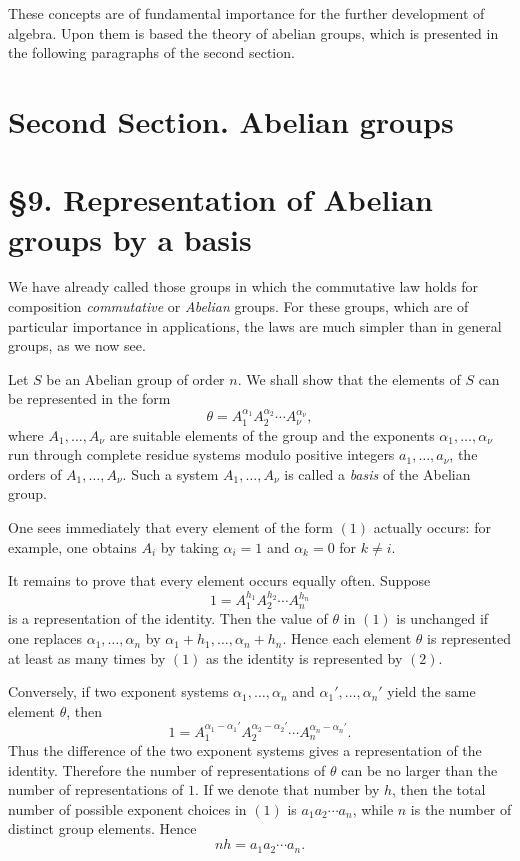 \documentclass[11pt,a4paper]{book}
\begin{document}
These concepts are of fundamental importance for the further development of algebra. Upon them is based the theory of abelian groups, which is presented in the following paragraphs of the second section.

\section*{Second Section. Abelian groups}

\section*{\S 9. Representation of Abelian groups by a basis}

We have already called those groups in which the commutative law holds for composition \emph{commutative} or \emph{Abelian} groups. For these groups, which are of particular importance in applications, the laws are much simpler than in general groups, as we now see.

Let \(S\) be an Abelian group of order \(n\). We shall show that the elements of \(S\) can be represented in the form
\[
\theta=A_1^{\alpha_1}A_2^{\alpha_2}\cdots A_\nu^{\alpha_\nu},
\tag{1}
\]
where \(A_1,\dots,A_\nu\) are suitable elements of the group and the exponents \(\alpha_1,\dots,\alpha_\nu\) run through complete residue systems modulo positive integers \(a_1,\dots,a_\nu\), the orders of \(A_1,\dots,A_\nu\). Such a system \(A_1,\dots,A_\nu\) is called a \emph{basis} of the Abelian group.

One sees immediately that every element of the form \((1)\) actually occurs: for example, one obtains \(A_i\) by taking \(\alpha_i=1\) and \(\alpha_k=0\) for \(k\neq i\).

It remains to prove that every element occurs equally often. Suppose
\[
1=A_1^{h_1}A_2^{h_2}\cdots A_n^{h_n}
\tag{2}
\]
is a representation of the identity. Then the value of \(\theta\) in \((1)\) is unchanged if one replaces \(\alpha_1,\dots,\alpha_n\) by \(\alpha_1+h_1,\dots,\alpha_n+h_n\). Hence each element \(\theta\) is represented at least as many times by \((1)\) as the identity is represented by \((2)\).

Conversely, if two exponent systems \(\alpha_1,\dots,\alpha_n\) and \(\alpha_1',\dots,\alpha_n'\) yield the same element \(\theta\), then
\[
1=A_1^{\alpha_1-\alpha_1'}A_2^{\alpha_2-\alpha_2'}\cdots A_n^{\alpha_n-\alpha_n'}.
\tag{3}
\]
Thus the difference of the two exponent systems gives a representation of the identity. Therefore the number of representations of \(\theta\) can be no larger than the number of representations of \(1\). If we denote that number by \(h\), then the total number of possible exponent choices in \((1)\) is \(a_1a_2\cdots a_n\), while \(n\) is the number of distinct group elements. Hence
\[
nh=a_1a_2\cdots a_n.
\tag{4}
\]
\end{document}

